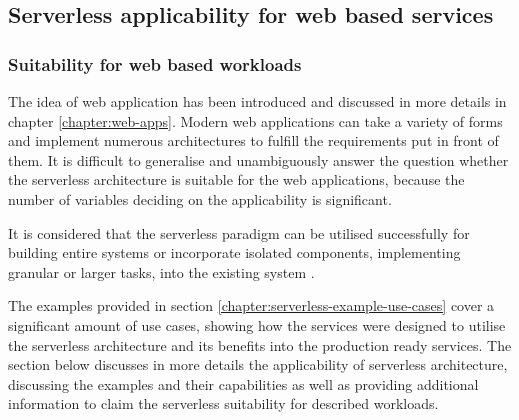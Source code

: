 \subsection{Serverless applicability for web based services}

\subsubsection{Suitability for web based workloads} \label{chapter:serverless-suitability-for-web-based-workloads}

The idea of web application has been introduced and discussed in more details in chapter \ref{chapter:web-apps}. Modern web applications can take a variety of forms and implement numerous architectures to fulfill the requirements put in front of them.
It is difficult to generalise and unambiguously answer the question whether the serverless architecture is suitable for the web applications, because the number of variables deciding on the applicability is significant.

It is considered that the serverless paradigm can be utilised successfully for building entire systems or incorporate isolated components, implementing granular or larger tasks, into the existing system \cite{ServerlessArchitectureOnAWS}.

The examples provided in section \ref{chapter:serverless-example-use-cases} cover a significant amount of use cases, showing how the services were designed to utilise the serverless architecture and its benefits into the production ready services. The section below discusses in more details the applicability of serverless architecture, discussing the examples and their capabilities as well as providing additional information to claim the serverless suitability for described workloads.



